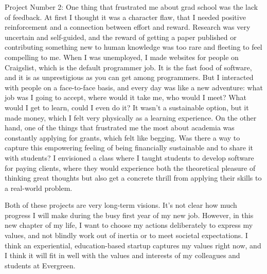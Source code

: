 \documentclass{article}
\begin{document}
Project Number 2: One thing that frustrated me about
grad school was the lack of feedback. At first I
thought it was a character flaw, that I needed
positive reinforcement and a connection between
effort and reward. Research was very uncertain
and self-guided, and the reward of getting a paper
published or contributing something new to
human knowledge was too rare and fleeting to feel
compelling to me. When I was unemployed, I made
websites for people on Craigslist, which is the
default programmer job. It is the fast food of
software, and it is as unprestigious as you can get
among programmers.
But I interacted with people on a face-to-face basis,
and every day was like a new adventure: what job was
I going to accept, where would it take me, who
would I meet?
What would I get to learn, could I even do it?
It wasn't a sustainable option, but it made money,
which I felt very physically as a learning experience. On the other hand, one of the things
that frustrated me the most about academia was
constantly applying for grants, which felt like
begging.
Was there a way to capture this empowering feeling
of being financially sustainable
and to share it with students? I envisioned a
class where I taught students to develop software
for paying clients, where they would experience
both the theoretical pleasure of thinking great
thoughts but also get a concrete thrill from
applying their skills to a real-world problem.

Both of these projects are very long-term visions.
It's not clear how much progress I will make during
the busy first year of my new job. However, in this
new chapter of my life, I want to choose my actions
deliberately to express my values, and not blindly
work out of inertia or to meet societal expectations.
I think an experiential, education-based startup
captures my values right now, and I think it will
fit in well with the values and interests of
my colleagues and students at Evergreen.
\end{document}
